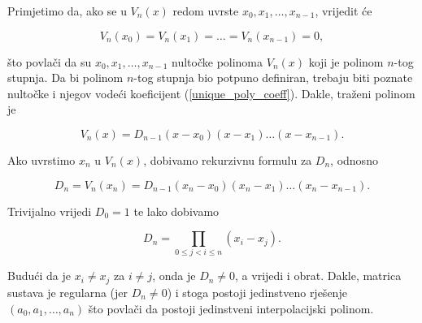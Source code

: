 Primjetimo da, ako se u $V_n(x)$ redom uvrste $x_0,x_1,\dots,x_{n-1}$, vrijedit će

$$
V_n(x_0)=V_n(x_1)=\dots=V_n(x_{n-1})=0,
$$

što povlači da su $x_0,x_1,\dots,x_{n-1}$ nultočke polinoma $V_n(x)$ koji je polinom $n$-tog stupnja.
Da bi polinom $n$-tog stupnja bio potpuno definiran, trebaju biti poznate nultočke i njegov
vodeći koeficijent (\ref{unique_poly_coeff}). Dakle, traženi polinom je

$$
V_n(x) = D_{n-1}(x-x_0)(x-x_1)\dots(x-x_{n-1}).
$$

Ako uvrstimo $x_n$ u $V_n(x)$, dobivamo rekurzivnu formulu za $D_n$, odnosno

$$
D_n=V_n(x_n)=D_{n-1}(x_n-x_0)(x_n-x_1)\dots(x_n-x_{n-1}).
$$

Trivijalno vrijedi $D_0 = 1$ te lako dobivamo

$$
D_n = \prod_{0\leq j<i\leq n}(x_i-x_j).
$$

Budući da je $x_i\neq x_j$ za $i\neq j$, onda je $D_n\neq 0$, a vrijedi i obrat.
Dakle, matrica sustava je regularna (jer $D_n\neq 0$) i stoga postoji jedinstveno rješenje
$(a_0,a_1,\dots,a_n)$ što povlači da postoji jedinstveni interpolacijski polinom.
